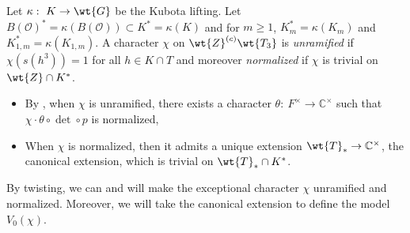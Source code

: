 \documentclass[11pt,reqno]{amsart}
\newcommand{\BC}{{\mathbb {C}}} \newcommand{\BD}{{\mathbb {D}}}
\newcommand{\CO}{{\mathcal {O}}} \newcommand{\CP}{{\mathcal {P}}}
\theoremstyle{plain}
\theoremstyle{remark} \newtheorem{remark}[thm]{Remark}
\theoremstyle{definition} \newtheorem{exercise}[thm]{Exercise}
\theoremstyle{definition} \newtheorem{example}[thm]{Example} \newtheorem{condition}[thm]{Condition}
\numberwithin{equation}{section}
\renewcommand{\-}{\text{--}}
\begin{document}
Let $\kappa:\ K\to\wt{G}$ be the Kubota lifting. Let $B(\CO)^*=\kappa(B(\CO))\subset K^*=\kappa(K)$ and for $m\geq1$, $K_m^*=\kappa(K_m)$ and $K_{1,m}^*=\kappa(K_{1,m})$. A character $\chi$ on $\wt{Z}^{(c)}\wt{T_3}$ is  {\em unramified} if $\chi(s(h^3))=1$ for all $h\in K\cap T$ and moreover    {\em normalized} if $\chi$ is trivial on $\wt{Z}\cap K^*$. 
\begin{itemize}
\item By \cite[Lemma I.1.1]{KP84}, when $\chi$ is unramified, there exists a character $\theta:\ F^\times\to\BC^\times$ such that $\chi\cdot \theta\circ\det\circ p$ is normalized,
\item When $\chi$ is normalized, then it  admits a unique extension $\wt{T}_*\to\BC^\times$, the canonical extension,  which is   trivial on $\wt{T}_*\cap K^*$.
\end{itemize}
By twisting, we can and will  make the exceptional character $\chi$  unramified and normalized. Moreover, we will take the canonical extension to  define the model $V_0(\chi)$.
\end{document}
